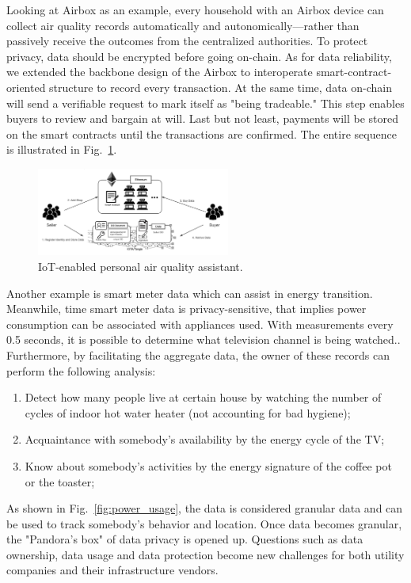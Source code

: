 \documentclass[conference]{IEEEtran}
\begin{document}
Looking at Airbox\cite{LASS} as an example, every household with an Airbox device can collect air quality records automatically and autonomically—rather than passively receive the outcomes from the centralized authorities. To protect privacy, data should be encrypted before going on-chain. As for data reliability, we extended the backbone design of the Airbox to interoperate smart-contract-oriented structure to record every transaction. At the same time, data on-chain will send a verifiable request to mark itself as "being tradeable." This step enables buyers to review and bargain at will. Last but not least, payments will be stored on the smart contracts until the transactions are confirmed. The entire sequence is illustrated in Fig.~\ref{fig:airbox}.

\begin{figure}[htbp]
    \centering
    \includegraphics[width=2.5in]{airbox}
    \caption{IoT-enabled personal air quality assistant.}
    \label{fig:airbox}
\end{figure}

Another example is smart meter data which can assist in energy transition. Meanwhile, time smart meter data is privacy-sensitive, that implies power consumption can be associated with appliances used. With measurements every 0.5 seconds, it is possible to determine what television channel is being watched.\cite{SmartGridPrivacy}. Furthermore, by facilitating the aggregate data, the owner of these records can perform the following analysis:
\begin{enumerate}
    \item Detect how many people live at certain house by watching the number of cycles of indoor hot water heater (not accounting for bad hygiene);
    \item Acquaintance with somebody's availability by the energy cycle of the TV;
    \item Know about somebody's activities by the energy signature of the coffee pot or the toaster;
\end{enumerate}

As shown in Fig.~\ref{fig:power_usage}, the data is considered granular data and can be used to track somebody's behavior and location. Once data becomes granular, the "Pandora's box" of data privacy is opened up. Questions such as data ownership, data usage and data protection become new challenges for both utility companies and their infrastructure vendors.
\end{document}

